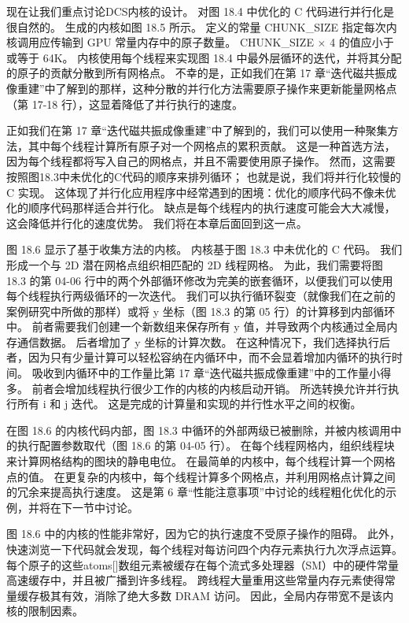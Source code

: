现在让我们重点讨论DCS内核的设计。 对图 18.4 中优化的 C 代码进行并行化是很自然的。 生成的内核如图 18.5 所示。 定义的常量 CHUNK\_SIZE 指定每次内核调用应传输到 GPU 常量内存中的原子数量。 CHUNK\_SIZE × 4 的值应小于或等于 64K。 内核使用每个线程来实现图 18.4 中最外层循环的迭代，并将其分配的原子的贡献分散到所有网格点。 不幸的是，正如我们在第 17 章“迭代磁共振成像重建”中了解到的那样，这种分散的并行化方法需要原子操作来更新能量网格点（第 17-18 行），这显着降低了并行执行的速度。

正如我们在第 17 章“迭代磁共振成像重建”中了解到的，我们可以使用一种聚集方法，其中每个线程计算所有原子对一个网格点的累积贡献。 这是一种首选方法，因为每个线程都将写入自己的网格点，并且不需要使用原子操作。 然而，这需要按照图18.3中未优化的C代码的顺序来排列循环； 也就是说，我们将并行化较慢的 C 实现。 这体现了并行化应用程序中经常遇到的困境：优化的顺序代码不像未优化的顺序代码那样适合并行化。 缺点是每个线程内的执行速度可能会大大减慢，这会降低并行化的速度优势。 我们将在本章后面回到这一点。

图 18.6 显示了基于收集方法的内核。 内核基于图 18.3 中未优化的 C 代码。 我们形成一个与 2D 潜在网格点组织相匹配的 2D 线程网格。 为此，我们需要将图 18.3 的第 04-06 行中的两个外部循环修改为完美的嵌套循环，以便我们可以使用每个线程执行两级循环的一次迭代。 我们可以执行循环裂变（就像我们在之前的案例研究中所做的那样）或将 y 坐标（图 18.3 的第 05 行）的计算移到内部循环中。 前者需要我们创建一个新数组来保存所有 y 值，并导致两个内核通过全局内存通信数据。 后者增加了 y 坐标的计算次数。 在这种情况下，我们选择执行后者，因为只有少量计算可以轻松容纳在内循环中，而不会显着增加内循环的执行时间。 吸收到内循环中的工作量比第 17 章“迭代磁共振成像重建”中的工作量小得多。 前者会增加线程执行很少工作的内核的内核启动开销。 所选转换允许并行执行所有 i 和 j 迭代。 这是完成的计算量和实现的并行性水平之间的权衡。

在图 18.6 的内核代码内部，图 18.3 中循环的外部两级已被删除，并被内核调用中的执行配置参数取代（图 18.6 的第 04-05 行）。 在每个线程网格内，组织线程块来计算网格结构的图块的静电电位。 在最简单的内核中，每个线程计算一个网格点的值。 在更复杂的内核中，每个线程计算多个网格点，并利用网格点计算之间的冗余来提高执行速度。 这是第 6 章“性能注意事项”中讨论的线程粗化优化的示例，并将在下一节中讨论。

图 18.6 中的内核的性能非常好，因为它的执行速度不受原子操作的阻碍。 此外，快速浏览一下代码就会发现，每个线程对每访问四个内存元素执行九次浮点运算。 每个原子的这些atoms[]数组元素被缓存在每个流式多处理器（SM）中的硬件常量高速缓存中，并且被广播到许多线程。 跨线程大量重用这些常量内存元素使得常量缓存极其有效，消除了绝大多数 DRAM 访问。 因此，全局内存带宽不是该内核的限制因素。

